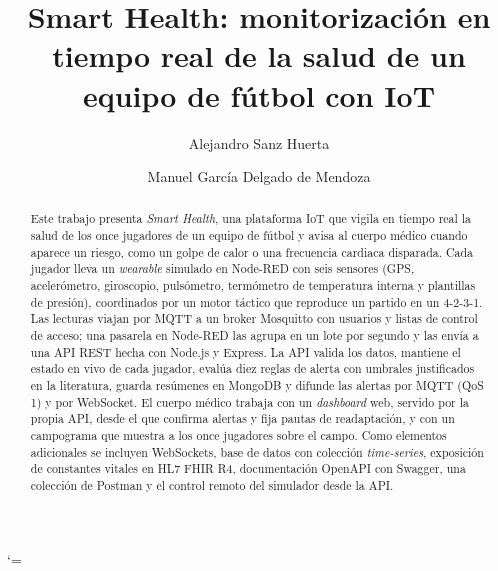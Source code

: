 \documentclass[runningheads]{llncs}
\begin{document}
\catcode`\/=\active
\sloppy
\setlength{\emergencystretch}{3em}
%
\title{Smart Health: monitorización en tiempo real de la salud de un equipo de fútbol con IoT}
%
%
\author{Alejandro Sanz Huerta \and Manuel García Delgado de Mendoza}
%
%
%
\maketitle
%
\begin{abstract}
Este trabajo presenta \emph{Smart Health}, una plataforma IoT que vigila en tiempo real la salud de los once jugadores de un equipo de fútbol y avisa al cuerpo médico cuando aparece un riesgo, como un golpe de calor o una frecuencia cardiaca disparada. Cada jugador lleva un \emph{wearable} simulado en Node-RED con seis sensores (GPS, acelerómetro, giroscopio, pulsómetro, termómetro de temperatura interna y plantillas de presión), coordinados por un motor táctico que reproduce un partido en un 4-2-3-1. Las lecturas viajan por MQTT a un broker Mosquitto con usuarios y listas de control de acceso; una pasarela en Node-RED las agrupa en un lote por segundo y las envía a una API REST hecha con Node.js y Express. La API valida los datos, mantiene el estado en vivo de cada jugador, evalúa diez reglas de alerta con umbrales justificados en la literatura, guarda resúmenes en MongoDB y difunde las alertas por MQTT (QoS 1) y por WebSocket. El cuerpo médico trabaja con un \emph{dashboard} web, servido por la propia API, desde el que confirma alertas y fija pautas de readaptación, y con un campograma que muestra a los once jugadores sobre el campo. Como elementos adicionales se incluyen WebSockets, base de datos con colección \emph{time-series}, exposición de constantes vitales en HL7 FHIR R4, documentación OpenAPI con Swagger, una colección de Postman y el control remoto del simulador desde la API.

\end{abstract}

\end{document}

